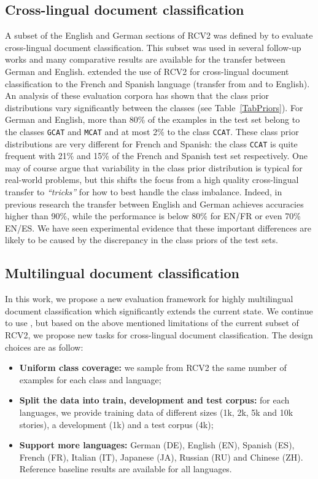 \documentclass[10pt, a4paper]{article}
\begin{document}
\subsection{Cross-lingual document classification}

A subset of the English and German sections of RCV2 was
defined by \cite{Klementiev:2012:coling_reuters} to evaluate cross-lingual
document classification.
This subset was used in several follow-up works and many comparative results are available for the transfer between German and English.
\cite{Mougadala:2016:naacl_biword} extended the use of RCV2 
for cross-lingual document classification to the French and Spanish language
(transfer from and to English).
An analysis of these evaluation corpora has shown that the class prior distributions vary
significantly between the classes (see Table~\ref{TabPriors}). For German and
English, more than 80\% of the examples in the test set belong to the classes
\texttt{GCAT} and \texttt{MCAT} and at most 2\% to the class \texttt{CCAT}.
These class prior distributions are very different for French and Spanish: the
class \texttt{CCAT} is quite frequent with 21\% and 15\% of the French and Spanish
test set respectively.
One may of course argue that variability in the class prior distribution is typical for
real-world problems, but this shifts the focus from a high quality cross-lingual transfer to \textit{``tricks''} for how to best handle the class imbalance.
Indeed, in previous research the transfer between English and German achieves accuracies higher than 90\%, while the performance is below 80\% for EN/FR or even 70\% EN/ES. We have seen experimental evidence that these important differences are likely to be caused by the discrepancy in the class priors of the test sets.

\subsection{Multilingual document classification}

In this work, we propose a new evaluation framework for highly multilingual document classification which significantly extends the current state. We continue to use \rcv{}, but based on the above mentioned limitations of the current subset of RCV2, we propose new tasks for cross-lingual document classification.  The design choices are as follow:

\begin{itemize}
  \item \textbf{Uniform class coverage:}
    we sample from RCV2 the same number of examples for each class and language;
  \item \textbf{Split the data into train, development and test corpus:}
  for each languages, we provide training data of different sizes
	(1k, 2k, 5k and 10k stories),
	a development (1k) and a test corpus (4k);
  \item \textbf{Support more languages:}
    German (DE), English (EN), Spanish (ES), French (FR), Italian (IT), Japanese (JA),  Russian (RU) and Chinese (ZH).
	Reference baseline results are available for all languages.
\end{itemize}
\end{document}
